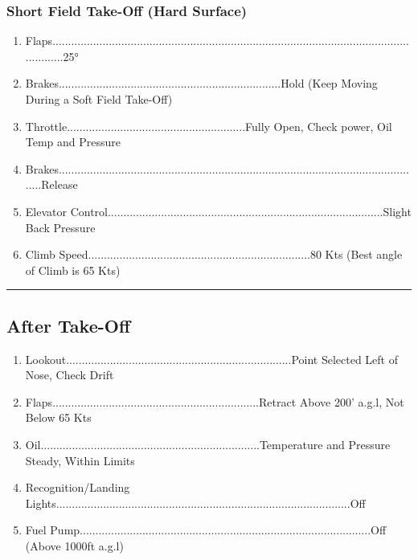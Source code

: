\documentclass[a4paper]{article}
\newenvironment{numberedchecklist}{
  \begin{enumerate}[label=\arabic*., leftmargin=*, align=left]
    \setlength{\itemsep}{2pt}
    \setlength{\parskip}{0pt}
    \setlength{\parsep}{0pt}
}{
  \end{enumerate}
}
\begin{document}
\subsubsection*{Short Field Take-Off (Hard Surface)}
\begin{numberedchecklist}
\item Flaps..............................................................................................................................25°
\item Brakes.......................................................................Hold (Keep Moving During a Soft Field Take-Off)
\item Throttle.........................................................Fully Open, Check power, Oil Temp and Pressure
\item Brakes.....................................................................................................................Release
\item Elevator Control........................................................................................Slight Back Pressure
\item Climb Speed.......................................................................80 Kts (Best angle of Climb is 65 Kts)
\end{numberedchecklist}

\rule{\linewidth}{0.4pt}

\subsection*{After Take-Off}
\begin{numberedchecklist}
\item Lookout........................................................................Point Selected Left of Nose, Check Drift
\item Flaps..................................................................Retract Above 200’ a.g.l, Not Below 65 Kts
\item Oil......................................................................Temperature and Pressure Steady, Within Limits
\item Recognition/Landing Lights..............................................................................................Off
\item Fuel Pump.............................................................................................Off (Above 1000ft a.g.l)
\end{numberedchecklist}
\end{document}
